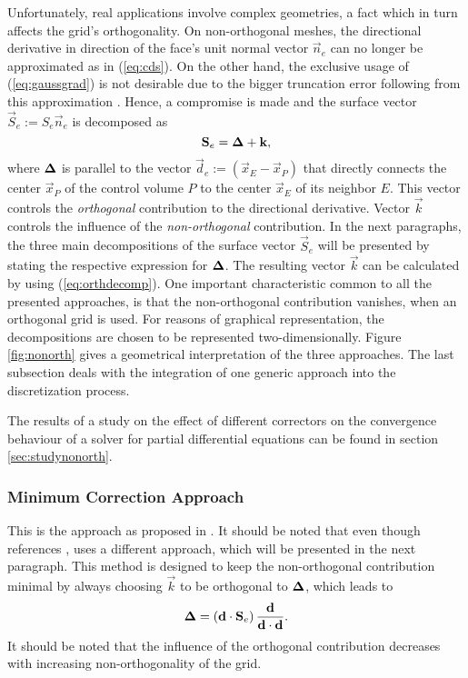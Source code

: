 Unfortunately, real applications involve complex geometries, a fact which in turn affects the grid's orthogonality. On non-orthogonal meshes, the directional derivative in direction of the face's unit normal vector \(\vec{n}_e\) can no longer be approximated as in (\ref{eq:cds}). On the other hand, the exclusive usage of (\ref{eq:gaussgrad}) is not desirable due to the bigger truncation error following from this approximation \cite{jasak96}. Hence, a compromise is made and the surface vector \(\vec{S}_e := S_e \vec{n}_e\) is decomposed as
\begin{equation}
  \label{eq:orthdecomp}
  \mathbf{S}_e = \boldsymbol{\Delta} + \mathbf{k},
\end{equation}
where \(\boldsymbol{\Delta}\) is parallel to the vector \(\vec{d}_e := \left(\vec{x}_E - \vec{x}_P\right)\) that directly connects the center \(\vec{x}_P\) of the control volume \(P\) to the center \(\vec{x}_E\) of its neighbor \(E\). This vector controls the \emph{orthogonal} contribution to the directional derivative. Vector \(\vec{k}\) controls the influence of the \emph{non-orthogonal} contribution. In the next paragraphs, the three main decompositions of the surface vector \(\vec{S}_e\) will be presented by stating the respective expression for \(\boldsymbol{\Delta}\). The resulting vector \(\vec{k}\) can be calculated by using (\ref{eq:orthdecomp}). One important characteristic common to all the presented approaches, is that the non-orthogonal contribution vanishes, when an orthogonal grid is used. For reasons of graphical representation, the decompositions are chosen to be represented two-dimensionally. Figure \ref{fig:nonorth} gives a geometrical interpretation of the three approaches. The last subsection deals with the integration of one generic approach into the discretization process. 

The results of a study on the effect of different correctors on the convergence behaviour of a solver for partial differential equations can be found in section \ref{sec:studynonorth}.

\subsubsection{Minimum Correction Approach}

This is the approach as proposed in \cite{muzaferja}. It should be noted that even though \cite{ferziger02} references \cite{muzaferja}, \cite{ferziger02} uses a different approach, which will be presented in the next paragraph. This method is designed to keep the non-orthogonal contribution minimal by always choosing \(\vec{k}\) to be orthogonal to \(\boldsymbol{\Delta}\), which leads to
\begin{displaymath}
  \boldsymbol{\Delta} = \left( \mathbf{d} \cdot \mathbf{S}_e \right) \frac{\mathbf{d}}{\mathbf{d} \cdot \mathbf{d}}.
\end{displaymath}
It should be noted that the influence of the orthogonal contribution decreases with increasing non-orthogonality of the grid.


